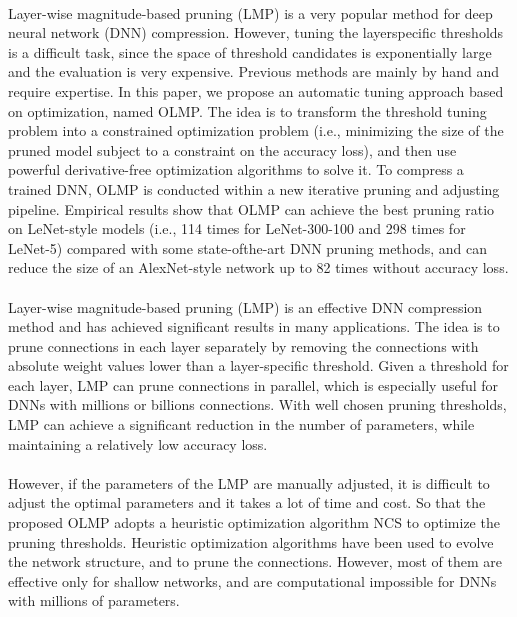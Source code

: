 \documentclass[10pt,letterpaper]{article}
\begin{document}
\paragraph{}
Layer-wise magnitude-based pruning (LMP) is a very popular method for deep neural network (DNN) compression. However, tuning the layerspecific thresholds is a difficult task, since the space of threshold candidates is exponentially large and the evaluation is very expensive. Previous methods are mainly by hand and require expertise. In this paper, we propose an automatic tuning approach based on optimization, named OLMP. The idea is to transform the threshold tuning problem into a constrained optimization problem (i.e., minimizing the size of the pruned model subject to a constraint on the accuracy loss), and then use powerful derivative-free optimization algorithms to solve it. To compress a trained DNN, OLMP is conducted within a new iterative pruning and adjusting pipeline. Empirical results show that OLMP can achieve the best pruning ratio on LeNet-style models (i.e., 114 times for LeNet-300-100 and 298 times for LeNet-5) compared with some state-ofthe-art DNN pruning methods, and can reduce the size of an AlexNet-style network up to 82 times without accuracy loss.

\paragraph{}
Layer-wise magnitude-based pruning (LMP) is an effective DNN compression method and has achieved significant results in many applications. The idea is to prune connections in each layer separately by removing the connections with absolute weight values lower than a layer-specific threshold. Given a threshold for each layer, LMP can prune connections in parallel, which is especially useful for DNNs with millions or billions connections. With well chosen pruning thresholds, LMP can achieve a significant reduction in the number of parameters, while maintaining a relatively low accuracy loss.

\paragraph{}
However, if the parameters of the LMP are manually adjusted, it is difficult to adjust the optimal parameters and it takes a lot of time and cost. So that the proposed OLMP adopts a heuristic optimization algorithm NCS\cite{Ke2016Negatively} to optimize the pruning thresholds. Heuristic optimization algorithms have been used to evolve the network structure, and to prune the connections. However, most of them are effective only for shallow networks, and are computational impossible for DNNs with millions of parameters.
\end{document}
